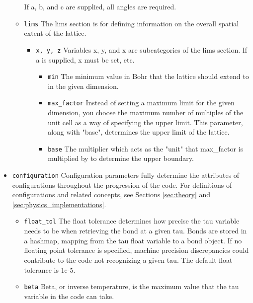 \begin{itemize}
\begin{itemize}
        If a, b, and c are supplied, all angles are required.
      \item \texttt{lims}
        The lims section is for defining information on the overall spatial 
        extent of the lattice. 
        \begin{itemize}
          \item \texttt{x, y, z}
            Variables x, y, and x are subcategories of the lims section.
            If a is supplied, x must be set, etc. 
            \begin{itemize}
              \item \texttt{min}
                The minimum value in Bohr that the lattice should extend to in
                the given dimension.
              \item \texttt{max\_factor}
                Instead of setting a maximum limit for the given dimension, you
                choose the maximum number of multiples of the unit cell as a 
                way of specifying the upper limit.  
                This parameter, along with "base", determines the upper limit 
                of the lattice.
              \item \texttt{base}
                The multiplier which acts as the "unit" that max\_factor is 
                multiplied by to determine the upper boundary. 
            \end{itemize}
        \end{itemize}
    \end{itemize}
  \item \texttt{configuration}
    Configuration parameters fully determine the attributes of configurations
    throughout the progression of the code. 
    For definitions of configurations and related concepts, see Sections
    \ref{sec:theory} and \ref{sec:physics_implementations}.
    \begin{itemize}
      \item \texttt{float\_tol}
        The float tolerance determines how precise the tau variable needs to be
        when retrieving the bond at a given tau. 
        Bonds are stored in a hashmap, mapping from the tau float variable to a
        bond object. 
        If no floating point tolerance is specified, machine precision 
        discrepancies could contribute to the code not recognizing a given tau. 
        The default float tolerance is 1e-5. 
      \item \texttt{beta}
        Beta, or inverse temperature, is the maximum value that the tau 
        variable in the code can take.

\end{itemize}
\end{itemize}
